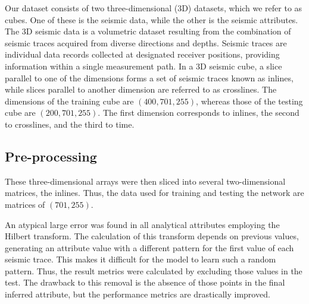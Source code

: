 \documentclass[conference]{IEEEtran}
\begin{document}
Our dataset consists of two three-dimensional (3D) datasets, which we refer to as cubes. One of these is the seismic data, while the other is the seismic attributes. The 3D seismic data is a volumetric dataset resulting from the combination of seismic traces acquired from diverse directions and depths. Seismic traces are individual data records collected at designated receiver positions, providing information within a single measurement path. In a 3D seismic cube, a slice parallel to one of the dimensions forms a set of seismic traces known as inlines, while slices parallel to another dimension are referred to as crosslines.
The dimensions of the training cube are $(400,701,255)$, whereas those of the testing cube are $(200,701,255)$. The first dimension corresponds to inlines, the second to crosslines, and the third to time.

\subsection{Pre-processing}

These three-dimensional arrays were then sliced into several two-dimensional matrices, the inlines. %
Thus, the data used for training and testing the network are matrices of $(701,255)$.

An atypical large error was found in all analytical attributes employing the Hilbert transform. The calculation of this transform depends on previous values, generating an attribute value with a different pattern for the first value of each seismic trace.
This makes it difficult for the model to learn such a random pattern. Thus, the result metrics were calculated by excluding those values in the test. The drawback to this removal is the absence of those points in the final inferred attribute, but the performance metrics are drastically improved. %
    
\end{document}
